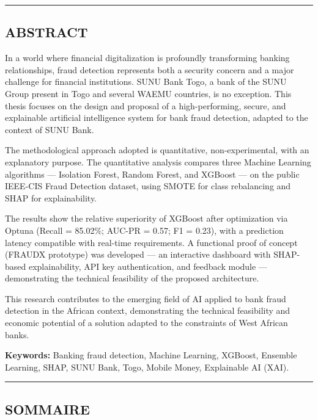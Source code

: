 \documentclass[
  12pt,
]{article}
\begin{document}
\begin{center}\rule{0.5\linewidth}{0.5pt}\end{center}

\subsection{ABSTRACT}\label{abstract}

In a world where financial digitalization is profoundly transforming
banking relationships, fraud detection represents both a security
concern and a major challenge for financial institutions. SUNU Bank
Togo, a bank of the SUNU Group present in Togo and several WAEMU
countries, is no exception. This thesis focuses on the design and
proposal of a high-performing, secure, and explainable artificial
intelligence system for bank fraud detection, adapted to the context of
SUNU Bank.

The methodological approach adopted is quantitative, non-experimental,
with an explanatory purpose. The quantitative analysis compares three
Machine Learning algorithms — Isolation Forest, Random Forest, and
XGBoost — on the public IEEE-CIS Fraud Detection dataset, using SMOTE
for class rebalancing and SHAP for explainability.

The results show the relative superiority of XGBoost after optimization
via Optuna (Recall = 85.02\%; AUC-PR = 0.57; F1 = 0.23), with a
prediction latency compatible with real-time requirements. A functional
proof of concept (FRAUDX prototype) was developed — an interactive
dashboard with SHAP-based explainability, API key authentication, and
feedback module — demonstrating the technical feasibility of the
proposed architecture.

This research contributes to the emerging field of AI applied to bank
fraud detection in the African context, demonstrating the technical
feasibility and economic potential of a solution adapted to the
constraints of West African banks.

\textbf{Keywords:} Banking fraud detection, Machine Learning, XGBoost,
Ensemble Learning, SHAP, SUNU Bank, Togo, Mobile Money, Explainable AI
(XAI).

\begin{center}\rule{0.5\linewidth}{0.5pt}\end{center}

\subsection{SOMMAIRE}\label{sommaire}
\end{document}
